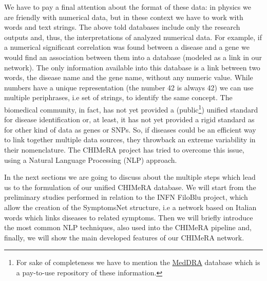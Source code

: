 \documentclass{standalone}
\begin{document}
We have to pay a final attention about the format of these data: in physics we are friendly with numerical data, but in these context we have to work with words and text strings.
The above told databases include only the research outputs and, thus, the interpretations of analyzed numerical data.
For example, if a numerical significant correlation was found between a disease and a gene we would find an association between them into a database (modeled as a link in our network).
The only information available into this database is a link between two words, the disease name and the gene name, without any numeric value.
While numbers have a unique representation (the number 42 is always 42) we can use multiple periphrases, i.e set of strings, to identify the same concept.
The biomedical community, in fact, has not yet provided a (public\footnote{
  For sake of completeness we have to mention the \href{https://www.meddra.org/}{MedDRA} database which is a pay-to-use repository of these information.
}) unified standard for disease identification or, at least, it has not yet provided a rigid standard as for other kind of data as genes or SNPs.
So, if diseases could be an efficient way to link together multiple data sources, they throwback an extreme variability in their nomenclature.
The \textsf{CHIMeRA} project has tried to overcome this issue, using a Natural Language Processing (NLP) approach.

In the next sections we are going to discuss about the multiple steps which lead us to the formulation of our unified \textsf{CHIMeRA} database.
We will start from the preliminary studies performed in relation to the INFN FiloBlu project, which allow the creation of the \textsf{SymptomsNet} structure, i.e a  network based on Italian words which links diseases to related symptoms.
Then we will briefly introduce the most common NLP techniques, also used into the \textsf{CHIMeRA} pipeline and, finally, we will show the main developed features of our \textsf{CHIMeRA} network.

\end{document}
